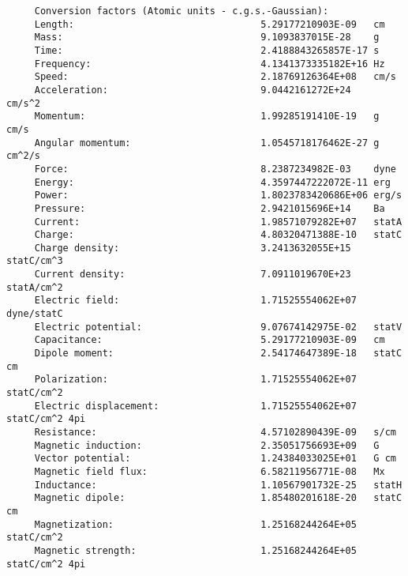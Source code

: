 \documentclass[12pt,a4paper]{article}
\begin{document}
\begin{verbatim}
     Conversion factors (Atomic units - c.g.s.-Gaussian):
     Length:                                 5.29177210903E-09   cm
     Mass:                                   9.1093837015E-28    g
     Time:                                   2.4188843265857E-17 s
     Frequency:                              4.1341373335182E+16 Hz
     Speed:                                  2.18769126364E+08   cm/s
     Acceleration:                           9.0442161272E+24    cm/s^2
     Momentum:                               1.99285191410E-19   g cm/s
     Angular momentum:                       1.0545718176462E-27 g cm^2/s
     Force:                                  8.2387234982E-03    dyne
     Energy:                                 4.3597447222072E-11 erg
     Power:                                  1.8023783420686E+06 erg/s
     Pressure:                               2.9421015696E+14    Ba
     Current:                                1.98571079282E+07   statA
     Charge:                                 4.80320471388E-10   statC
     Charge density:                         3.2413632055E+15    statC/cm^3
     Current density:                        7.0911019670E+23    statA/cm^2
     Electric field:                         1.71525554062E+07   dyne/statC
     Electric potential:                     9.07674142975E-02   statV
     Capacitance:                            5.29177210903E-09   cm
     Dipole moment:                          2.54174647389E-18   statC cm
     Polarization:                           1.71525554062E+07   statC/cm^2
     Electric displacement:                  1.71525554062E+07   statC/cm^2 4pi
     Resistance:                             4.57102890439E-09   s/cm
     Magnetic induction:                     2.35051756693E+09   G
     Vector potential:                       1.24384033025E+01   G cm
     Magnetic field flux:                    6.58211956771E-08   Mx
     Inductance:                             1.10567901732E-25   statH
     Magnetic dipole:                        1.85480201618E-20   statC cm
     Magnetization:                          1.25168244264E+05   statC/cm^2
     Magnetic strength:                      1.25168244264E+05   statC/cm^2 4pi 


\end{verbatim}
\end{document}
